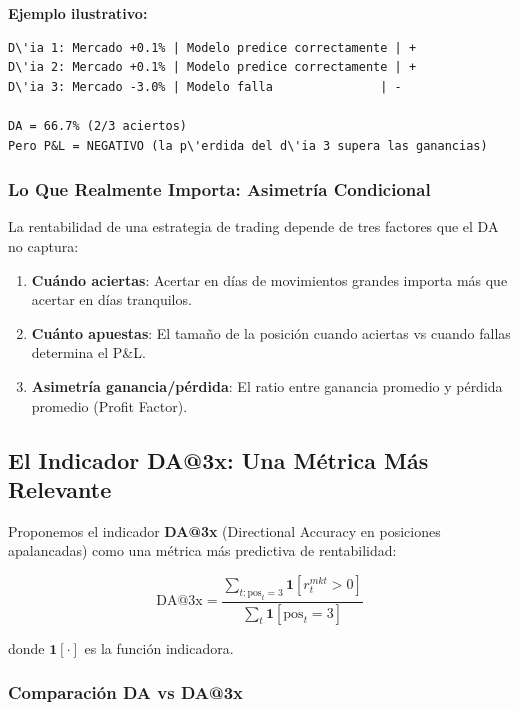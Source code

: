 \textbf{Ejemplo ilustrativo:}
\begin{verbatim}
D\'ia 1: Mercado +0.1% | Modelo predice correctamente | +
D\'ia 2: Mercado +0.1% | Modelo predice correctamente | +
D\'ia 3: Mercado -3.0% | Modelo falla               | -

DA = 66.7% (2/3 aciertos)
Pero P&L = NEGATIVO (la p\'erdida del d\'ia 3 supera las ganancias)
\end{verbatim}

\subsubsection{Lo Que Realmente Importa: Asimetr\'ia Condicional}

La rentabilidad de una estrategia de trading depende de tres factores que el DA no captura:

\begin{enumerate}
    \item \textbf{Cu\'ando aciertas}: Acertar en d\'ias de movimientos grandes importa m\'as que acertar en d\'ias tranquilos.

    \item \textbf{Cu\'anto apuestas}: El tama\~no de la posici\'on cuando aciertas vs cuando fallas determina el P\&L.

    \item \textbf{Asimetr\'ia ganancia/p\'erdida}: El ratio entre ganancia promedio y p\'erdida promedio (Profit Factor).
\end{enumerate}

\subsection{El Indicador DA@3x: Una M\'etrica M\'as Relevante}
\label{subsec:da_3x}

Proponemos el indicador \textbf{DA@3x} (Directional Accuracy en posiciones apalancadas) como una m\'etrica m\'as predictiva de rentabilidad:

\begin{equation}
\text{DA@3x} = \frac{\sum_{t: \text{pos}_t = 3} \mathbf{1}[r_t^{mkt} > 0]}{\sum_{t} \mathbf{1}[\text{pos}_t = 3]}
\end{equation}

donde $\mathbf{1}[\cdot]$ es la funci\'on indicadora.

\subsubsection{Comparaci\'on DA vs DA@3x}

